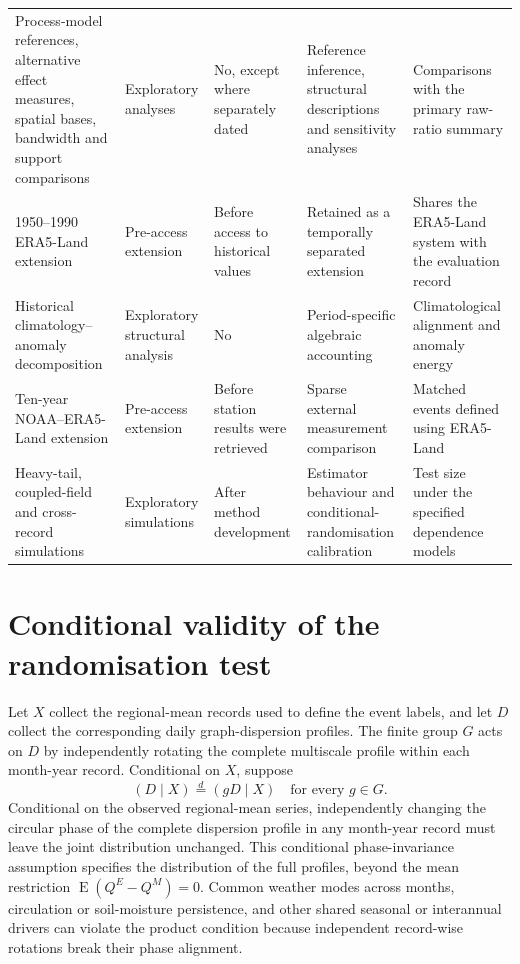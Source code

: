 \documentclass[namedate,webpdf,modern,mediumone]{oup-authoring-template}
\theoremstyle{thmstyleone}
\begin{document}
\begin{table}[!htbp]
\begin{tabular}{Z{0.17\textwidth}Z{0.16\textwidth}Z{0.15\textwidth}Z{0.24\textwidth}Z{0.19\textwidth}}
Process-model references, alternative effect measures, spatial bases,
bandwidth and support comparisons &
Exploratory analyses & No, except where separately dated & Reference inference, structural descriptions and sensitivity analyses &
Comparisons with the primary raw-ratio summary \\

1950--1990 ERA5-Land extension &
Pre-access extension & Before access to historical values & Retained as a temporally separated extension &
Shares the ERA5-Land system with the evaluation record \\

Historical climatology--anomaly decomposition &
Exploratory structural analysis & No & Period-specific algebraic accounting &
Climatological alignment and anomaly energy \\

Ten-year NOAA--ERA5-Land extension &
Pre-access extension & Before station results were retrieved & Sparse external measurement comparison &
Matched events defined using ERA5-Land \\

Heavy-tail, coupled-field and cross-record simulations &
Exploratory simulations & After method development & Estimator behaviour and conditional-randomisation calibration &
Test size under the specified dependence models \\
\bottomrule
\end{tabular}
\end{table}
\normalsize

\section{Conditional validity of the randomisation test}
\label{sec:product-proof}

Let $X$ collect the regional-mean records used to define the event
labels, and let $D$ collect the corresponding daily graph-dispersion profiles.
The finite group $G$ acts on $D$ by independently rotating the complete
multiscale profile within each month-year record. Conditional on $X$, suppose
\begin{equation}
 (D\mid X)\overset{d}{=}(gD\mid X)\quad\text{for every }g\in G.
 \label{eq:s-cyclic-null}
\end{equation}
Conditional on the observed regional-mean series,
independently changing the circular phase of the complete dispersion profile
in any month-year record must leave the joint distribution unchanged. This conditional
phase-invariance assumption specifies the distribution of the full profiles,
beyond the mean restriction $\operatorname E(Q^E-Q^M)=0$. Common weather modes across
months, circulation or soil-moisture persistence, and other shared seasonal or
interannual drivers can violate the product condition because independent
record-wise rotations break their phase alignment.
\end{document}
